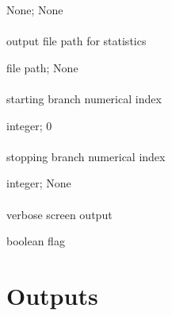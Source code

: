 \documentclass[letterpaper,12pt,english]{sphinxmanual}
\begin{document}
 None;  None


\subsubsection{}
\label{\detokenize{prog_desc:out}}
 output file path for statistics

 file path;  None


\subsubsection{}
\label{\detokenize{prog_desc:id18}}
 starting branch numerical index

 integer;  0


\subsubsection{}
\label{\detokenize{prog_desc:id19}}
 stopping branch numerical index

 integer;  None


\subsubsection{}
\label{\detokenize{prog_desc:id20}}
 verbose screen output

 boolean flag


\chapter{Outputs}
\label{\detokenize{output::doc}}\label{\detokenize{output:output}}\label{\detokenize{output:outputs}}
\end{document}
